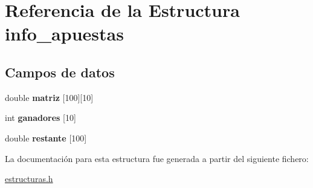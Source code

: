 \hypertarget{structinfo__apuestas}{}\section{Referencia de la Estructura info\+\_\+apuestas}
\label{structinfo__apuestas}
\subsection*{Campos de datos}
\begin{DoxyCompactItemize}
\item 
\mbox{\label{structinfo__apuestas_a2d8c35f278591a017a4bc2adf0a56401}} 
double {\bfseries matriz} \mbox{[}100\mbox{]}\mbox{[}10\mbox{]}
\item 
\mbox{\label{structinfo__apuestas_aaac66b9e93faa5ac599f69c78d7281c8}} 
int {\bfseries ganadores} \mbox{[}10\mbox{]}
\item 
\mbox{\label{structinfo__apuestas_aeb91ba445f3e90004883b0c5d1ac9500}} 
double {\bfseries restante} \mbox{[}100\mbox{]}
\end{DoxyCompactItemize}


La documentación para esta estructura fue generada a partir del siguiente fichero\+:\begin{DoxyCompactItemize}
\item 
\hyperlink{estructuras_8h}{estructuras.\+h}\end{DoxyCompactItemize}
